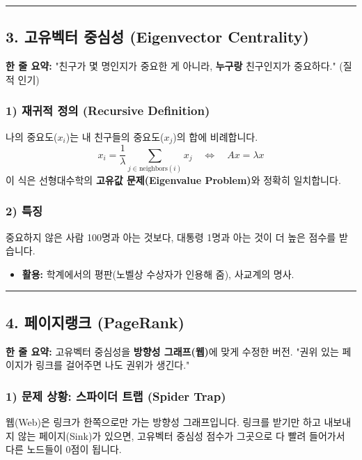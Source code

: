 \documentclass[11pt,a4paper]{book}
\theoremstyle{definition}
\begin{document}
\vspace{0.5cm}\hrule\vspace{0.5cm}

\subsection{3. 고유벡터 중심성 (Eigenvector Centrality)}

\begin{conceptbox}[title={개념 3: 유유상종 (The Influencer)}]
\textbf{한 줄 요약:} "친구가 몇 명인지가 중요한 게 아니라, \textbf{누구랑} 친구인지가 중요하다." (질적 인기)
\end{conceptbox}

\subsubsection*{1) 재귀적 정의 (Recursive Definition)}
나의 중요도($x_i$)는 내 친구들의 중요도($x_j$)의 합에 비례합니다.
$$ x_i = \frac{1}{\lambda} \sum_{j \in \text{neighbors}(i)} x_j \quad \iff \quad Ax = \lambda x $$
이 식은 선형대수학의 \textbf{고유값 문제(Eigenvalue Problem)}와 정확히 일치합니다.

\subsubsection*{2) 특징}
중요하지 않은 사람 100명과 아는 것보다, 대통령 1명과 아는 것이 더 높은 점수를 받습니다.
\begin{itemize}
    \item \textbf{활용:} 학계에서의 평판(노벨상 수상자가 인용해 줌), 사교계의 명사.
\end{itemize}

\vspace{0.5cm}\hrule\vspace{0.5cm}

\subsection{4. 페이지랭크 (PageRank)}


\begin{conceptbox}[title={개념 4: 구글을 만든 알고리즘 (The Authority)}]
\textbf{한 줄 요약:} 고유벡터 중심성을 \textbf{방향성 그래프(웹)}에 맞게 수정한 버전. "권위 있는 페이지가 링크를 걸어주면 나도 권위가 생긴다."
\end{conceptbox}

\subsubsection*{1) 문제 상황: 스파이더 트랩 (Spider Trap)}
웹(Web)은 링크가 한쪽으로만 가는 방향성 그래프입니다. 링크를 받기만 하고 내보내지 않는 페이지(Sink)가 있으면, 고유벡터 중심성 점수가 그곳으로 다 빨려 들어가서 다른 노드들이 0점이 됩니다.
\end{document}
